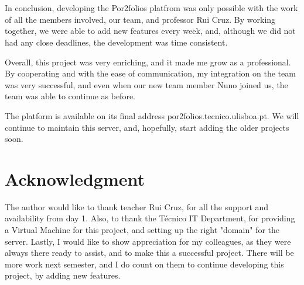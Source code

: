 \documentclass[a4paper,12pt,journal,twoside,compsoc]{PPIEEEtran}
\begin{document}
\section{}
In conclusion, developing the Por2folios platfrom was only possible with the work of all the members involved, our team, and professor Rui Cruz. By working together, we were able to add new features every week, and, although we did not had any close deadlines, the development was time consistent.

Overall, this project was very enriching, and it made me grow as a professional. By cooperating and with the ease of communication, my integration on the team was very successful, and even when our new team member Nuno joined us, the team was able to continue as before.

The platform is available on its final address por2folios.tecnico.ulisboa.pt.
We will continue to maintain this server, and, hopefully, start adding the older projects soon.

\ifCLASSOPTIONcompsoc
  \section*{} %
\else
  \section*{Acknowledgment}
\fi

The author would like to thank teacher Rui Cruz, for all the support and availability from day 1. Also, to thank the Técnico IT Department, for providing a Virtual Machine for this project, and setting up the right "domain" for the server.
Lastly, I would like to show appreciation for my colleagues, as they were always there ready to assist, and to make this a successful project.
There will be more work next semester, and I do count on them to continue developing this project, by adding new features.

% 
\end{document}
